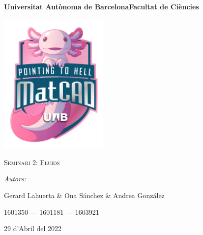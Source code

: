 \documentclass[a4paper, 11pt]{article}
\begin{document}
\begin{titlepage}
    \centering
    {\bfseries\LARGE Universitat Autònoma de Barcelona\newline Facultat de Ciències\par}
    \vspace{2cm}
    {\hspace{-1em}\includegraphics[width=0.4\textwidth]{logo.png}\par}
    \vspace{1cm}
    {\scshape\Huge Seminari 2: Fluids\par} 
    \vspace{1cm}
    {\Large \itshape Autors: \par}
    {\Large  Gerard Lahuerta \& Ona Sánchez \& Andrea González \par}
    {\Large 1601350 --- 1601181 --- 1603921 \par}
    \vspace{1cm}
    {\Large 29 d'Abril del 2022\par}
\end{titlepage}

\justifying

\newpage
\setcounter{page}{2}
\pagestyle{plain}
\tableofcontents
\cleardoublepage
{}
\newpage
\end{document}
